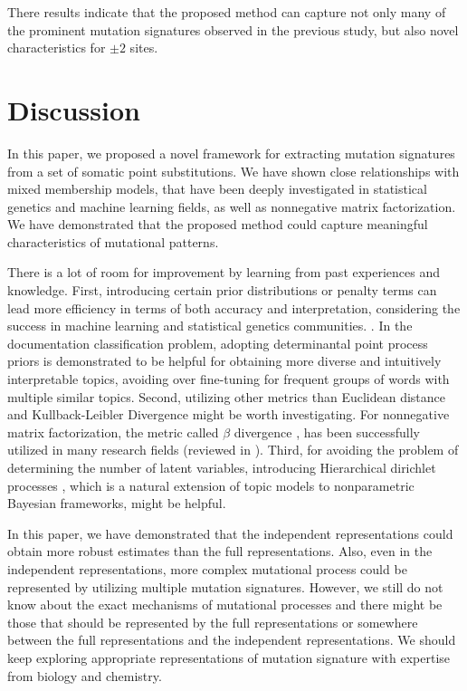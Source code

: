 There results indicate that the proposed method can capture not only many of the prominent mutation signatures observed in the previous study,
but also novel characteristics for $\pm 2$ sites.




\section*{Discussion}


In this paper, we proposed a novel framework for extracting mutation signatures from a set of somatic point substitutions.
We have shown close relationships with mixed membership models, 
that have been deeply investigated in statistical genetics and machine learning fields, as well as nonnegative matrix factorization.
We have demonstrated that the proposed method could capture meaningful characteristics of mutational patterns.

There is a lot of room for improvement by learning from past experiences and knowledge.
First, introducing certain prior distributions or penalty terms can lead more efficiency in terms of both accuracy and interpretation,
considering the success in machine learning and statistical genetics communities.
\cite{hoyer2004non, engelhardt2010analysis}.
In the documentation classification problem, 
adopting determinantal point process priors \cite{kulesza2012determinantal, kwok2012priors}
is demonstrated to be helpful for obtaining more diverse and intuitively interpretable topics,
avoiding over fine-tuning for frequent groups of words with multiple similar topics.
Second, utilizing other metrics than Euclidean distance and Kullback-Leibler Divergence might be worth investigating.
For nonnegative matrix factorization, 
the metric called $\beta$ divergence \cite{basu1998robust, eguchi2001robustifying}, 
has been successfully utilized in many research fields (reviewed in \cite{fevotte2011algorithms}).
Third, for avoiding the problem of determining the number of latent variables, 
introducing Hierarchical dirichlet processes \cite{teh2006hierarchical}, 
which is a natural extension of topic models to nonparametric Bayesian frameworks, might be helpful.


In this paper, we have demonstrated that the independent representations could obtain more robust estimates than the full representations.
Also, even in the independent representations, more complex mutational process could be represented by utilizing multiple mutation signatures.
However, we still do not know about the exact mechanisms of mutational processes and 
there might be those that should be represented by the full representations or somewhere between the full representations and the independent representations.
We should keep exploring appropriate representations of mutation signature with expertise from biology and chemistry.


